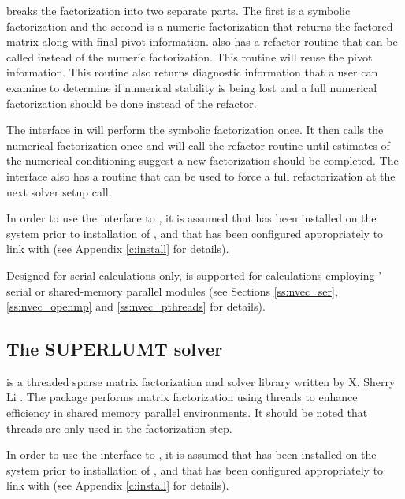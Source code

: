 {\klu} breaks the factorization into two separate parts.  The first is a symbolic
factorization and the second is a numeric 
factorization that returns the factored matrix along with final pivot information.  
{\klu} also has a refactor routine that can be called instead of the numeric 
factorization.  This routine will reuse the pivot information.  This routine 
also returns diagnostic information that a user can examine to determine if 
numerical stability is being lost and a full numerical factorization should 
be done instead of the refactor.  

The {\klu} interface in {\sundials} will perform the symbolic factorization once.
It then calls the numerical factorization once and will call the refactor routine
until estimates of the numerical conditioning suggest a new factorization 
should be completed.  The {\klu} interface also has a  routine that 
can be used to force a full refactorization at the next solver setup call.

In order to use the {\sundials} interface to {\klu}, it is
assumed that {\klu} has been installed on the system prior to
installation of {\sundials}, and that {\sundials} has been configured
appropriately to link with {\klu} (see Appendix \ref{c:install} for details).

Designed for serial calculations only, {\klu} is supported for
calculations employing {\sundials}' serial or shared-memory parallel
{\nvector} modules (see Sections \ref{ss:nvec_ser}, \ref{ss:nvec_openmp}
and \ref{ss:nvec_pthreads} for details).



\subsection{The SUPERLUMT solver}\label{ss:superlumt}

{\superlumt} is a threaded sparse matrix factorization and solver
library written by X. Sherry Li \cite{SuperLUMT_site,Li:05,DGL:99}.  
The package performs matrix factorization using threads to enhance efficiency
in shared memory parallel environments.  It should be noted that threads are
only used in the factorization step.

In order to use 
the {\sundials} interface to {\superlumt}, it is assumed that {\superlumt}
has been installed on the system prior to installation of {\sundials}, and
that {\sundials} has been configured appropriately to link with
{\superlumt} (see Appendix \ref{c:install} for details).

